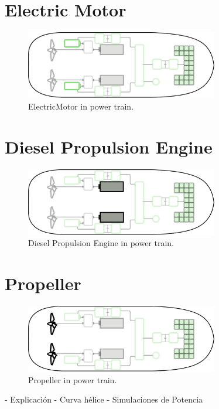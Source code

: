 \section{Electric Motor}

\begin{figure}[h]
    \centering
    \includegraphics[width=0.75\textwidth]{images/chapter05/ElectricMotor_scheme.jpg}
    \caption{ElectricMotor in power train.}
    \label{ElectricMotor}
\end{figure}

\newpage

\section{Diesel Propulsion Engine}

\begin{figure}[!ht]
    \centering
    \includegraphics[width=0.75\textwidth]{images/chapter05/DieselEngine_scheme.jpg}
    \caption{Diesel Propulsion Engine in power train.}
    \label{Diesel Engine}
\end{figure}

\section{Propeller}

\begin{figure}[!ht]
    \centering
    \includegraphics[width=0.75\textwidth]{images/chapter05/Propeller_scheme.jpg}
    \caption{Propeller in power train.}
    \label{Propeller}
\end{figure}

- Explicación
- Curva hélice
- Simulaciones de Potencia